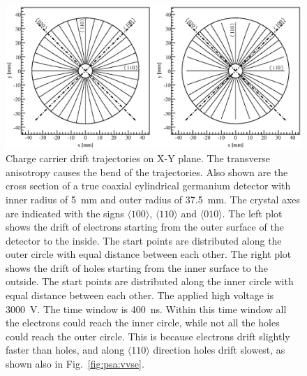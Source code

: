 \begin{figure}[tbhp]
  \centering
  \includegraphics[width=\textwidth]{trjs}
  \caption{Charge carrier drift trajectories on X-Y plane. The     transverse anisotropy causes the bend of the trajectories. Also     shown are the cross section of a true coaxial cylindrical     germanium detector with inner radius of 5~mm and outer radius of     37.5~mm. The crystal axes are indicated with the signs $\langle     100 \rangle$, $\langle 110 \rangle$ and $\langle 010 \rangle$. The     left plot shows the drift of electrons starting from the outer     surface of the detector to the inside. The start points are     distributed along the outer circle with equal distance between     each other. The right plot shows the drift of holes starting from     the inner surface to the outside. The start points are distributed     along the inner circle with equal distance between each other. The     applied high voltage is 3000~V. The time window is 400~ns. Within     this time window all the electrons could reach the inner circle,     while not all the holes could reach the outer circle. This is     because electrons drift slightly faster than holes, and along     $\langle 110 \rangle$ direction holes drift slowest, as shown also     in Fig.~\ref{fig:psa:vvse}.}
  \label{fig:psa:trjs}
\end{figure}


